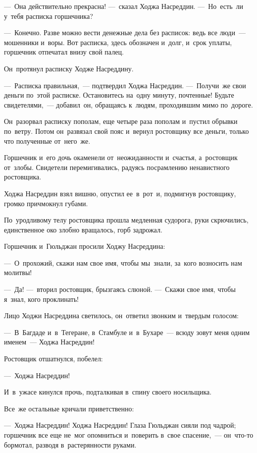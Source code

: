 \documentclass[12pt,a4paper]{book}
\begin{document}
—~Она действительно прекрасна! —~сказал Ходжа Насреддин. —~Но~есть~ли у~тебя расписка горшечника?

—~Конечно. Разве можно вести денежные дела без расписок: ведь все люди~— мошенники и~воры. Вот расписка, здесь обозначен и~долг, и~срок уплаты, горшечник отпечатал внизу свой палец.

Он~протянул расписку Ходже Насреддину.

—~Расписка правильная,~— подтвердил Ходжа Насреддин. —~Получи~же свои деньги по~этой расписке. Остановитесь на~одну минуту, почтенные! Будьте свидетелями,~— добавил~он, обращаясь к~людям, проходившим мимо по~дороге.

Он~разорвал расписку пополам, еще четыре раза пополам и~пустил обрывки по~ветру. Потом он~развязал свой пояс и~вернул ростовщику все деньги, только что полученные от~него~же.

Горшечник и~его дочь окаменели от~неожиданности и~счастья, а~ростовщик от~злобы. Свидетели перемигивались, радуясь посрамлению ненавистного ростовщика.

Ходжа Насреддин взял вишню, опустил ее~в~рот~и, подмигнув ростовщику, громко причмокнул губами.

По~уродливому телу ростовщика прошла медленная судорога, руки скрючились, единственное око злобно вращалось, горб задрожал.

Горшечник и~Гюльджан просили Ходжу Насреддина:

—~О~прохожий, скажи нам свое имя, чтобы мы~знали, за~кого возносить нам молитвы!

—~Да! —~вторил ростовщик, брызгаясь слюной. —~Скажи свое имя, чтобы я~знал, кого проклинать!

Лицо Ходжи Насреддина светилось, он~ответил звонким и~твердым голосом:

—~В~Багдаде и~в~Тегеране, в~Стамбуле и~в~Бухаре~— всюду зовут меня одним именем~— Ходжа Насреддин!

Ростовщик отшатнулся, побелел:

—~Ходжа Насреддин!

И~в~ужасе кинулся прочь, подталкивая в~спину своего носильщика.

Все~же остальные кричали приветственно:

—~Ходжа Насреддин! Ходжа Насреддин! Глаза Гюльджан сияли под чадрой; горшечник все еще не~мог опомниться и~поверить в~свое спасение,~— он~что-то бормотал, разводя в~растерянности руками.


\chapter{}
\end{document}
